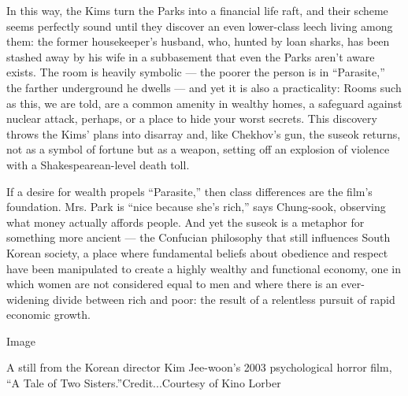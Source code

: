 In this way, the Kims turn the Parks into a financial life raft, and
their scheme seems perfectly sound until they discover an even
lower-class leech living among them: the former housekeeper's husband,
who, hunted by loan sharks, has been stashed away by his wife in a
subbasement that even the Parks aren't aware exists. The room is heavily
symbolic --- the poorer the person is in ``Parasite,'' the farther
underground he dwells --- and yet it is also a practicality: Rooms such
as this, we are told, are a common amenity in wealthy homes, a safeguard
against nuclear attack, perhaps, or a place to hide your worst secrets.
This discovery throws the Kims' plans into disarray and, like Chekhov's
gun, the suseok returns, not as a symbol of fortune but as a weapon,
setting off an explosion of violence with a Shakespearean-level death
toll.

If a desire for wealth propels ``Parasite,'' then class differences are
the film's foundation. Mrs. Park is ``nice because she's rich,'' says
Chung-sook, observing what money actually affords people. And yet the
suseok is a metaphor for something more ancient --- the Confucian
philosophy that still influences South Korean society, a place where
fundamental beliefs about obedience and respect have been manipulated to
create a highly wealthy and functional economy, one in which women are
not considered equal to men and where there is an ever-widening divide
between rich and poor: the result of a relentless pursuit of rapid
economic growth.

Image

A still from the Korean director Kim Jee-woon's 2003 psychological
horror film, ``A Tale of Two Sisters.''Credit...Courtesy of Kino Lorber

